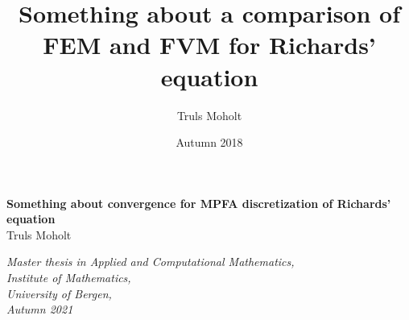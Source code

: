 \documentclass[12pt,oneside]{book}
\author{Truls Moholt}
\title{\vspace{-3.0cm}Something about a comparison of FEM and FVM for Richards' equation}
\date{Autumn 2018}
\numberwithin{equation}{chapter}
\theoremstyle{plain}
\begin{document}
\titlepage
\begin{center}
{\bf \LARGE Something about convergence for MPFA discretization of Richards' equation}\\
\vspace{10\in}
\vspace{150\in}
{\large Truls Moholt\\ \vspace{30\in}}

\vspace*{\fill}
\it{Master thesis in Applied and Computational Mathematics, \\Institute of Mathematics, \\University of Bergen, \\Autumn 2021}
\end{center}
\tableofcontents
\newpage
%












\end{document}
